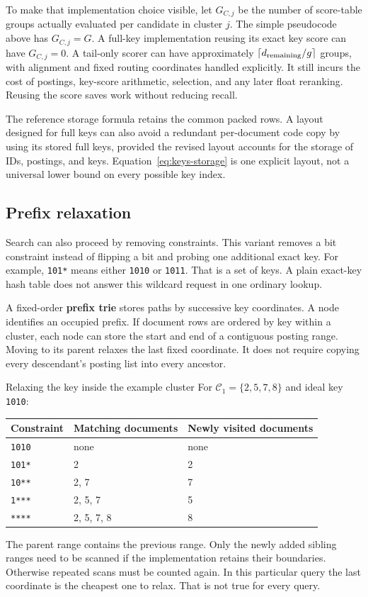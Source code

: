 To make that implementation choice visible, let $G_{C,j}$ be the number of score-table groups
actually evaluated per candidate in cluster $j$. The simple pseudocode above has $G_{C,j}=G$.
A full-key implementation reusing its exact key score can have $G_{C,j}=0$. A tail-only scorer
can have approximately $\left\lceil d_{\rm remaining}/g\right\rceil$ groups, with alignment and fixed routing
coordinates handled explicitly. It still incurs the cost of postings, key-score arithmetic, selection,
and any later float reranking. Reusing the score saves work without reducing recall.

The reference storage formula retains the common packed rows. A layout designed for full keys
can also avoid a redundant per-document code copy by using its stored full keys, provided the revised layout
accounts for the storage of IDs, postings, and keys. Equation~\eqref{eq:keys-storage} is
one explicit layout, not a universal lower bound on every possible key index.

\subsection{Prefix relaxation}
Search can also proceed by removing constraints. This variant removes a bit constraint
instead of flipping a bit and probing one additional exact key. For example, \texttt{101*} means either
\texttt{1010} or \texttt{1011}. That is a set of keys. A plain exact-key hash table does not
answer this wildcard request in one ordinary lookup.

A fixed-order \textbf{prefix trie} stores paths by successive key coordinates. A node identifies
an occupied prefix. If document rows are ordered by key within a cluster, each node can store
the start and end of a contiguous posting range. Moving to its parent relaxes the last fixed
coordinate. It does not require copying every descendant's posting list into every ancestor.

\begin{examplebox}{Relaxing the key inside the example cluster}
For $\mathcal C_1=\{2,5,7,8\}$ and ideal key \texttt{1010}:
\begin{center}
\begin{tabular}{@{}lll@{}}\toprule
Constraint & Matching documents & Newly visited documents\\\midrule
\texttt{1010} & none & none\\
\texttt{101*} & 2 & 2\\
\texttt{10**} & 2, 7 & 7\\
\texttt{1***} & 2, 5, 7 & 5\\
\texttt{****} & 2, 5, 7, 8 & 8\\\bottomrule
\end{tabular}
\end{center}
The parent range contains the previous range. Only the newly added sibling ranges need to be scanned if the
implementation retains their boundaries. Otherwise repeated scans must be counted again.
In this particular query the last coordinate is the cheapest one to relax. That is not true
for every query.
\end{examplebox}

